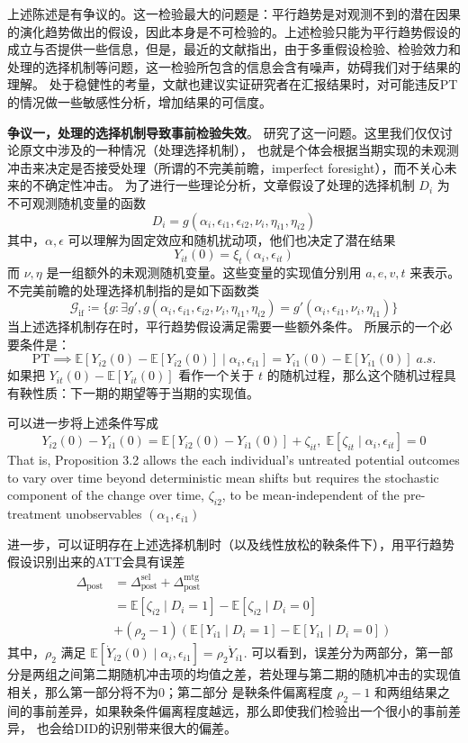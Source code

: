 \documentclass[../didNotes.tex]{subfiles}
\begin{document}
上述陈述是有争议的。这一检验最大的问题是：平行趋势是对观测不到的潜在因果的演化趋势做出的假设，因此本身是不可检验的。上述检验只能为平行趋势假设的
成立与否提供一些信息，但是，最近的文献指出，由于多重假设检验、检验效力和处理的选择机制等问题，这一检验所包含的信息会含有噪声，妨碍我们对于结果的理解。
处于稳健性的考量，文献也建议实证研究者在汇报结果时，对可能违反PT的情况做一些敏感性分析，增加结果的可信度。

\textbf{争议一，处理的选择机制导致事前检验失效}。\textcite{ghanem2025} 研究了这一问题。这里我们仅仅讨论原文中涉及的一种情况（处理选择机制），
也就是个体会根据当期实现的未观测冲击来决定是否接受处理（所谓的不完美前瞻，imperfect foresight），而不关心未来的不确定性冲击。
为了进行一些理论分析，文章假设了处理的选择机制 $D_{i}$ 为不可观测随机变量的函数
$$
D_{i} = g(\alpha_{i},\epsilon_{i 1}, \epsilon_{i 2}, \nu_{i}, \eta_{i 1}, \eta_{i 2})
$$
其中，$\alpha, \epsilon$ 可以理解为固定效应和随机扰动项，他们也决定了潜在结果
$$
Y_{i t}(0) = \xi_{t}(\alpha_{i}, \epsilon_{i t})
$$
而 $\nu,\eta$ 是一组额外的未观测随机变量。这些变量的实现值分别用 $a,e,v,t$ 来表示。不完美前瞻的处理选择机制指的是如下函数类
$$
\mathcal{G}_{\text{if}} \coloneqq \{ g: \exists g', g(\alpha_{i},\epsilon_{i 1}, \epsilon_{i 2}, \nu_{i}, \eta_{i 1}, \eta_{i 2}) = g'(\alpha_{i},\epsilon_{i 1}, \nu_{i}, \eta_{i 1}) \}
$$
当上述选择机制存在时，平行趋势假设满足需要一些额外条件。\textcite{ghanem2025} 所展示的一个必要条件是：
$$
\text{PT} \implies \mathbb{E}[Y_{i 2}(0)-\mathbb{E}[Y_{i 2}(0)] \mid \alpha_{i},\epsilon_{i 1}] = Y_{i 1}(0)-\mathbb{E}[Y_{i 1}(0)] \; \textit{a.s.}
$$
如果把 $Y_{i t}(0) - \mathbb{E}[Y_{i t}(0)]$ 看作一个关于 $t$ 的随机过程，那么这个随机过程具有鞅性质：下一期的期望等于当期的实现值。

可以进一步将上述条件写成
$$
Y_{i 2}(0) - Y_{i 1}(0) = \mathbb{E}[Y_{i 2}(0) - Y_{i 1}(0)] + \zeta_{i t}, \; \mathbb{E}[\zeta_{i t} \mid \alpha_{i},\epsilon_{i t}]=0
$$
That is, Proposition 3.2 allows the each individual's untreated potential outcomes to vary over time beyond
deterministic mean shifts but requires the stochastic component of the change over time, $\zeta_{i 2}$,
to be mean-independent of the pre-treatment unobservables $(\alpha_{1},\epsilon_{i 1})$

进一步，可以证明存在上述选择机制时（以及线性放松的鞅条件下），用平行趋势假设识别出来的ATT会具有误差
\begin{align*}
  \Delta_{\text{post}} &= \Delta_{\text{post}}^{\text{sel}} + \Delta_{\text{post}}^{\text{mtg}} \\
  &= \mathbb{E}[\zeta_{i 2} \mid D_{i}=1] - \mathbb{E}[\zeta_{i 2} \mid D_{i}=0] \\
  &+ (\rho_{2}-1) \left(\mathbb{E}[Y_{i 1} \mid D_{i}=1] - \mathbb{E}[Y_{i 1} \mid D_{i}=0]\right)
\end{align*}
其中，$\rho_{2}$ 满足 $\mathbb{E}[\dot{Y}_{i 2}(0) \mid \alpha_{i}, \epsilon_{i 1}]=\rho_{2} \dot{Y}_{i 1}$.
可以看到，误差分为两部分，第一部分是两组之间第二期随机冲击项的均值之差，若处理与第二期的随机冲击的实现值相关，那么第一部分将不为0；第二部分
是鞅条件偏离程度 $\rho_{2}-1$ 和两组结果之间的事前差异，如果鞅条件偏离程度越远，那么即使我们检验出一个很小的事前差异，
也会给DID的识别带来很大的偏差。
\end{document}
